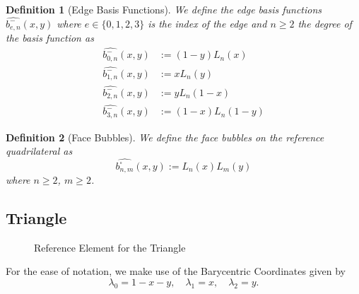\documentclass[10pt,a4paper]{article}
\newtheorem{defn}{Definition}
\begin{document}
    \begin{defn}[Edge Basis Functions]
        We define the edge basis functions $\widehat{b_{e,n}^{-}}(x,y)$ where $e \in \{0,1,2,3\}$ is the index of the edge and $n \geq 2$ the degree of the basis function as
        \begin{align*}
            \widehat{b_{0,n}^{-}}(x,y) &:= (1-y)L_n(x) \\
            \widehat{b_{1,n}^{-}}(x,y) &:= xL_n(y) \\
            \widehat{b_{2,n}^{-}}(x,y) &:= yL_n(1-x) \\
            \widehat{b_{3,n}^{-}}(x,y) &:= (1-x)L_n(1-y)
        \end{align*}
    \end{defn}

    \begin{defn}[Face Bubbles]
        We define the face bubbles on the reference quadrilateral as
        \begin{equation*}
            \widehat{b_{n,m}^{\square}}(x,y) := L_n(x)L_m(y)
        \end{equation*}
        where $n \geq 2$, $m\geq 2$.
    \end{defn}


\subsection{Triangle}

    \begin{figure}[ht!]
        \center
        \caption{Reference Element for the Triangle}
        \label{fig:ref_tria}
    \end{figure}

    For the ease of notation, we make use of the Barycentric Coordinates given by
    \begin{equation*}
        \lambda_0 = 1-x-y,\quad \lambda_1 = x,\quad \lambda_2 = y.
    \end{equation*}
    
\end{document}
